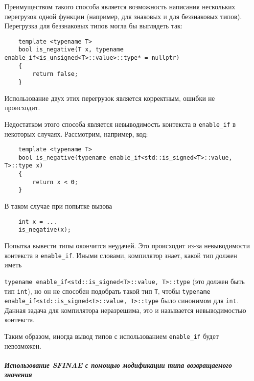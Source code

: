 	\vspace{\baselineskip}
	
	Преимуществом такого способа является возможность написания нескольких перегрузок одной функции (например, для знаковых и для беззнаковых типов). Перегрузка для беззнаковых типов могла бы выглядеть так:
	
	\begin{verbatim}
	template <typename T>
	bool is_negative(T x, typename enable_if<is_unsigned<T>::value>::type* = nullptr)
	{
		return false;
	}
	\end{verbatim}
	
	Использование двух этих перегрузок является корректным, ошибки не происходит.
	
	\vspace{\baselineskip}
	
	Недостатком этого способа является невыводимость контекста в \texttt{enable_if} в некоторых случаях. Рассмотрим, например, код:
	
	\begin{verbatim}
	template <typename T>
	bool is_negative(typename enable_if<std::is_signed<T>::value, T>::type x)
	{
		return x < 0;
	}
	\end{verbatim}
	
	В таком случае при попытке вызова
	
	\begin{verbatim}
	int x = ...
	is_negative(x);
	\end{verbatim}
	
	Попытка вывести типы окончится неудачей. Это происходит из-за невыводимости контекста в \texttt{enable_if}. Иными словами, компилятор знает, какой тип должен иметь 
	
	\texttt{typename enable_if<std::is_signed<T>::value, T>::type} (это должен быть тип \texttt{int}), но он не способен подобрать такой тип \texttt{T}, чтобы \texttt{typename enable_if<std::is_signed<T>::value, T>::type} было синонимом для \texttt{int}. Данная задача для компилятора неразрешима, это и называется невыводимостью контекста.
	
	Таким образом, иногда вывод типов с использованием \texttt{enable_if} будет невозможен.
	
\subparagraph{Использование SFINAE с помощью модификации типа возвращаемого значения \ \ \ \ \ \ \ \ \ \ \ \ \ \ \ }

